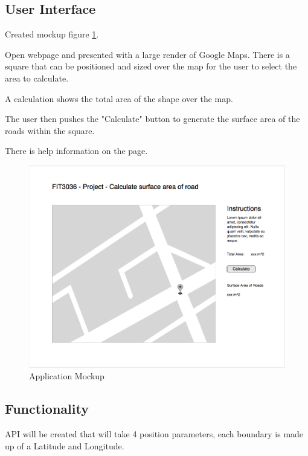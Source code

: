 \documentclass[a4paper,11pt]{article}
\begin{document}
\subsection{User Interface}


Created mockup figure \ref{fig:mockup}. %

Open webpage and presented with a large render of Google Maps. There is a square that can be positioned and sized over the map for the user to select the area to calculate.

A calculation shows the total area of the shape over the map.

The user then pushes the "Calculate" button to generate the surface area of the roads within the square.

There is help information on the page.

\begin{figure}[H]
  \includegraphics[width=\textwidth]{UI-mockup}
  \caption{Application Mockup}
  \label{fig:mockup}
\end{figure}

\subsection{Functionality}


API will be created that will take 4 position parameters, each boundary is made up of a Latitude and Longitude.
\end{document}
